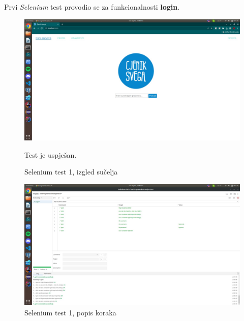 		 	
		 	Prvi \textit{Selenium} test provodio se za funkcionalnosti \textbf{login}.
		 	
		 	\begin{figure}[H]
			\includegraphics[width=\textwidth]{slike/sel1a.jpeg} %
			\caption{Selenium test 1, izgled sučelja}
			\label{fig:sel1a} %
			Test je uspješan.
			\end{figure}
			\begin{figure}[H]
			\includegraphics[width=\textwidth]{slike/sel1b.jpeg} %
			\caption{Selenium test 1, popis koraka}
			\label{fig:sel1b} %
			\end{figure}
			
